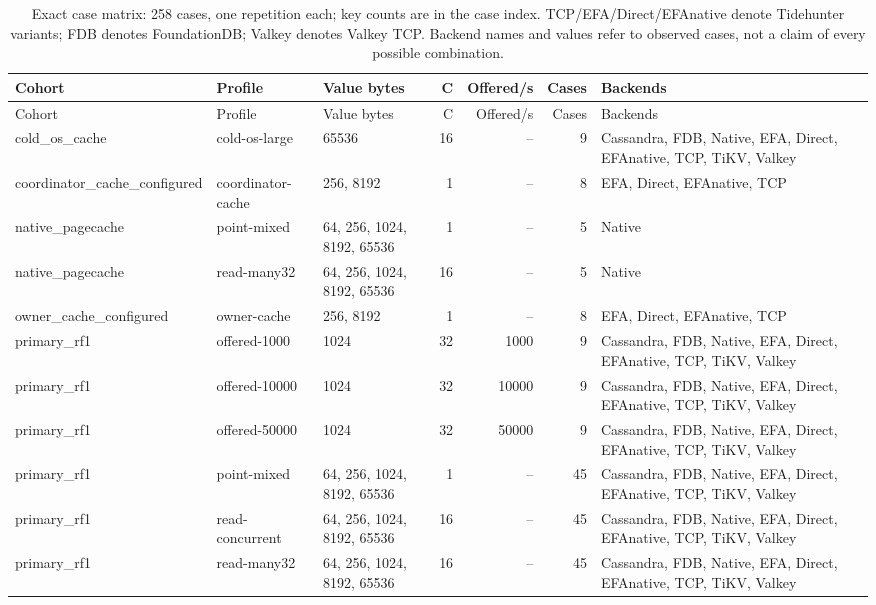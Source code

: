 \begin{landscape}
\scriptsize
\setlength{\tabcolsep}{2pt}
\sloppy
\begin{longtable}{p{3cm}p{2.5cm}p{3.1cm}rrrp{7cm}}
\caption{Exact case matrix: 258 cases, one repetition each; key counts are in the case index. TCP/EFA/Direct/EFAnative denote Tidehunter variants; FDB denotes FoundationDB; Valkey denotes Valkey TCP. Backend names and values refer to observed cases, not a claim of every possible combination.}\label{data-matrix}\\
\toprule
Cohort & Profile & Value bytes & C & Offered/s & Cases & Backends\\
\midrule
\endfirsthead
\toprule
Cohort & Profile & Value bytes & C & Offered/s & Cases & Backends\\
\midrule
\endhead
\bottomrule
\endfoot
cold\_\allowbreak{}os\_\allowbreak{}cache & cold-os-large & 65536 & 16 & -- & 9 & Cassandra, FDB, Native, EFA, Direct, EFAnative, TCP, TiKV, Valkey\\
coordinator\_\allowbreak{}cache\_\allowbreak{}configured & coordinator-cache & 256, 8192 & 1 & -- & 8 & EFA, Direct, EFAnative, TCP\\
native\_\allowbreak{}pagecache & point-mixed & 64, 256, 1024, 8192, 65536 & 1 & -- & 5 & Native\\
native\_\allowbreak{}pagecache & read-many32 & 64, 256, 1024, 8192, 65536 & 16 & -- & 5 & Native\\
owner\_\allowbreak{}cache\_\allowbreak{}configured & owner-cache & 256, 8192 & 1 & -- & 8 & EFA, Direct, EFAnative, TCP\\
primary\_\allowbreak{}rf1 & offered-1000 & 1024 & 32 & 1000 & 9 & Cassandra, FDB, Native, EFA, Direct, EFAnative, TCP, TiKV, Valkey\\
primary\_\allowbreak{}rf1 & offered-10000 & 1024 & 32 & 10000 & 9 & Cassandra, FDB, Native, EFA, Direct, EFAnative, TCP, TiKV, Valkey\\
primary\_\allowbreak{}rf1 & offered-50000 & 1024 & 32 & 50000 & 9 & Cassandra, FDB, Native, EFA, Direct, EFAnative, TCP, TiKV, Valkey\\
primary\_\allowbreak{}rf1 & point-mixed & 64, 256, 1024, 8192, 65536 & 1 & -- & 45 & Cassandra, FDB, Native, EFA, Direct, EFAnative, TCP, TiKV, Valkey\\
primary\_\allowbreak{}rf1 & read-concurrent & 64, 256, 1024, 8192, 65536 & 16 & -- & 45 & Cassandra, FDB, Native, EFA, Direct, EFAnative, TCP, TiKV, Valkey\\
primary\_\allowbreak{}rf1 & read-many32 & 64, 256, 1024, 8192, 65536 & 16 & -- & 45 & Cassandra, FDB, Native, EFA, Direct, EFAnative, TCP, TiKV, Valkey\\

\end{longtable}
\end{landscape}
